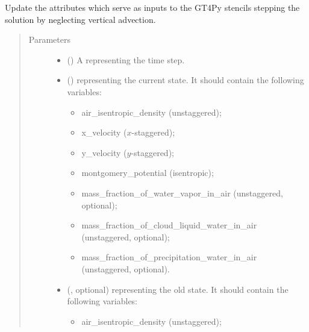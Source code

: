 \documentclass[letterpaper,10pt,english]{sphinxmanual}
\begin{document}
\begin{fulllineitems}
\begin{fulllineitems}
\label{\detokenize{api:dycore.prognostic_isentropic_nonconservative_centered.PrognosticIsentropicNonconservativeCentered._stencils_stepping_by_neglecting_vertical_advection_set_inputs}}
Update the attributes which serve as inputs to the GT4Py stencils stepping the solution
by neglecting vertical advection.
\begin{quote}\begin{description}
\item[{Parameters}] \leavevmode\begin{itemize}
\item {} 
 () \textendash{} A  representing the time step.

\item {} 
 () \textendash{} 
{\hyperref[\detokenize{api:storages.state_isentropic.StateIsentropic}]{}} representing the current state.
It should contain the following variables:
\begin{itemize}
\item {} 
air\_isentropic\_density (unstaggered);

\item {} 
x\_velocity (\(x\)-staggered);

\item {} 
y\_velocity (\(y\)-staggered);

\item {} 
montgomery\_potential (isentropic);

\item {} 
mass\_fraction\_of\_water\_vapor\_in\_air (unstaggered, optional);

\item {} 
mass\_fraction\_of\_cloud\_liquid\_water\_in\_air (unstaggered, optional);

\item {} 
mass\_fraction\_of\_precipitation\_water\_in\_air (unstaggered, optional).

\end{itemize}


\item {} 
 (, optional) \textendash{} 
{\hyperref[\detokenize{api:storages.state_isentropic.StateIsentropic}]{}} representing the old state.
It should contain the following variables:
\begin{itemize}
\item {} 
air\_isentropic\_density (unstaggered);


\end{itemize}
\end{itemize}
\end{description}
\end{quote}
\end{fulllineitems}
\end{fulllineitems}
\end{document}
